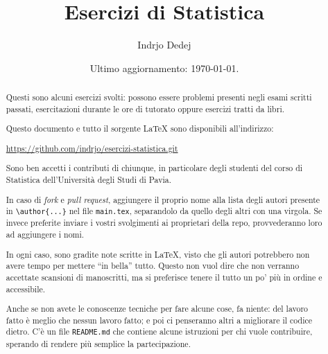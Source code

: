 


\title{Esercizi di Statistica}
\author{Indrjo Dedej}
\date{Ultimo aggiornamento: \today{}.}



\maketitle

\begin{abstract}
  Questi sono alcuni esercizi svolti: possono essere problemi presenti
  negli esami scritti passati, esercitazioni durante le ore di
  tutorato oppure esercizi tratti da libri.
    
  Questo documento e tutto il sorgente \LaTeX{} sono disponibili
  all'indirizzo:
  \begin{center}
    \url{https://github.com/indrjo/esercizi-statistica.git}
  \end{center}
  
  Sono ben accetti i contributi di chiunque, in particolare degli
  studenti del corso di {\sc Statistica} dell'Università degli Studi
  di Pavia.

  In caso di {\em fork} e {\em pull request}, aggiungere il proprio
  nome alla lista degli autori presente in \lstinline£\author{...}£
  nel file \lstinline£main.tex£, separandolo da quello degli altri con
  una virgola. Se invece preferite inviare i vostri svolgimenti ai
  proprietari della repo, provvederanno loro ad aggiungere i nomi.

  In ogni caso, sono gradite note scritte in \LaTeX{}, visto che gli
  autori potrebbero non avere tempo per mettere ``in bella''
  tutto. Questo non vuol dire che non verranno accettate scansioni di
  manoscritti, ma si preferisce tenere il tutto un po' più in ordine e
  accessibile.

  Anche se non avete le conoscenze tecniche per fare alcune cose, fa
  niente: del lavoro fatto è meglio che nessun lavoro fatto; e poi ci
  penseranno altri a migliorare il codice dietro. C'è un file
  \lstinline£README.md£ che contiene alcune istruzioni per chi vuole
  contribuire, sperando di rendere più semplice la partecipazione.
\end{abstract}

\tableofcontents








